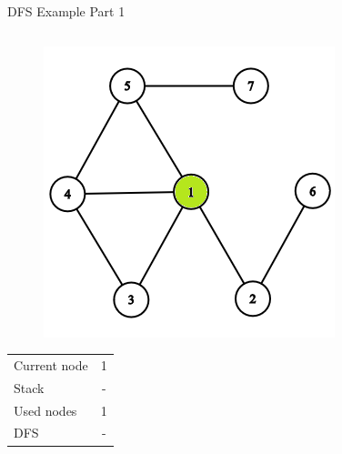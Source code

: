 \documentclass[aspectratio=169]{beamer}%
\begin{document}
\begin{frame}{DFS Example Part 1}
    \begin{columns}
        \begin{column}{0.32\textwidth}
            \begin{figure}[!ht]
                \centering
                \includegraphics[width=0.9\linewidth]{dfs 1.png}
            \end{figure}
            \begin{table}[ht]
                \centering
                \begin{tabular}{l c}
                    Current node & 1\\
                    Stack & -\\ 
                    Used nodes & 1\\
                    DFS & -
                \end{tabular}
            \end{table}
        \end{column}
        \hfill
        \begin{column}{0.32\textwidth}
            \begin{figure}[!ht]
                \centering

\end{figure}
\end{column}
\end{columns}
\end{frame}
\end{document}
